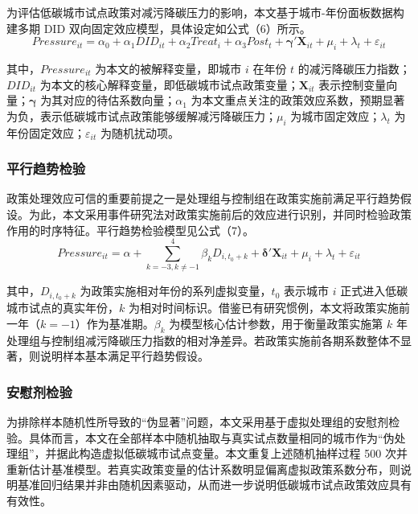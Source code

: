 \documentclass[12pt,a4paper]{ctexart}
\begin{document}
为评估低碳城市试点政策对减污降碳压力的影响，本文基于城市-年份面板数据构建多期 DID 双向固定效应模型，具体设定如公式（6）所示。
\begin{equation}
Pressure_{it}=\alpha_0+\alpha_1 DID_{it}+\alpha_2 Treat_i+\alpha_3 Post_t+\boldsymbol{\gamma}'\mathbf{X}_{it}+\mu_i+\lambda_t+\varepsilon_{it}
\end{equation}

其中，$Pressure_{it}$ 为本文的被解释变量，即城市 $i$ 在年份 $t$ 的减污降碳压力指数；$DID_{it}$ 为本文的核心解释变量，即低碳城市试点政策变量；$\mathbf{X}_{it}$ 表示控制变量向量；$\boldsymbol{\gamma}$ 为其对应的待估系数向量；$\alpha_1$ 为本文重点关注的政策效应系数，预期显著为负，表示低碳城市试点政策能够缓解减污降碳压力；$\mu_i$ 为城市固定效应；$\lambda_t$ 为年份固定效应；$\varepsilon_{it}$ 为随机扰动项。

\subsubsection{平行趋势检验}

政策处理效应可信的重要前提之一是处理组与控制组在政策实施前满足平行趋势假设。为此，本文采用事件研究法对政策实施前后的效应进行识别，并同时检验政策作用的时序特征。平行趋势检验模型见公式（7）。
\begin{equation}
Pressure_{it}=\alpha+\sum_{k=-3,k\neq -1}^{4}\beta_k D_{i,t_0+k}+\boldsymbol{\delta}'\mathbf{X}_{it}+\mu_i+\lambda_t+\varepsilon_{it}
\end{equation}

其中，$D_{i,t_0+k}$ 为政策实施相对年份的系列虚拟变量，$t_0$ 表示城市 $i$ 正式进入低碳城市试点的真实年份，$k$ 为相对时间标识。借鉴已有研究惯例，本文将政策实施前一年（$k=-1$）作为基准期。$\beta_k$ 为模型核心估计参数，用于衡量政策实施第 $k$ 年处理组与控制组减污降碳压力指数的相对净差异。若政策实施前各期系数整体不显著，则说明样本基本满足平行趋势假设。

\subsubsection{安慰剂检验}

为排除样本随机性所导致的“伪显著”问题，本文采用基于虚拟处理组的安慰剂检验。具体而言，本文在全部样本中随机抽取与真实试点数量相同的城市作为“伪处理组”，并据此构造虚拟低碳城市试点变量。本文重复上述随机抽样过程 500 次并重新估计基准模型。若真实政策变量的估计系数明显偏离虚拟政策系数分布，则说明基准回归结果并非由随机因素驱动，从而进一步说明低碳城市试点政策效应具有有效性。
\end{document}
